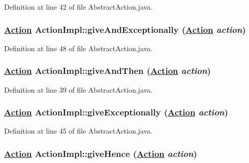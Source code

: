 Definition at line 42 of file Abstract\-Action.java.\hypertarget{classActionImpl_a6}{
\subsubsection[giveAndExceptionally]{\setlength{\rightskip}{0pt plus 5cm}\hyperlink{interfaceAction}{Action} Action\-Impl::give\-And\-Exceptionally (\hyperlink{interfaceAction}{Action} {\em action})}}
\label{classActionImpl_a6}




Definition at line 48 of file Abstract\-Action.java.\hypertarget{classActionImpl_a3}{
\subsubsection[giveAndThen]{\setlength{\rightskip}{0pt plus 5cm}\hyperlink{interfaceAction}{Action} Action\-Impl::give\-And\-Then (\hyperlink{interfaceAction}{Action} {\em action})}}
\label{classActionImpl_a3}




Definition at line 39 of file Abstract\-Action.java.\hypertarget{classActionImpl_a5}{
\subsubsection[giveExceptionally]{\setlength{\rightskip}{0pt plus 5cm}\hyperlink{interfaceAction}{Action} Action\-Impl::give\-Exceptionally (\hyperlink{interfaceAction}{Action} {\em action})}}
\label{classActionImpl_a5}




Definition at line 45 of file Abstract\-Action.java.\hypertarget{classActionImpl_a8}{
\subsubsection[giveHence]{\setlength{\rightskip}{0pt plus 5cm}\hyperlink{interfaceAction}{Action} Action\-Impl::give\-Hence (\hyperlink{interfaceAction}{Action} {\em action})}}
\label{classActionImpl_a8}




